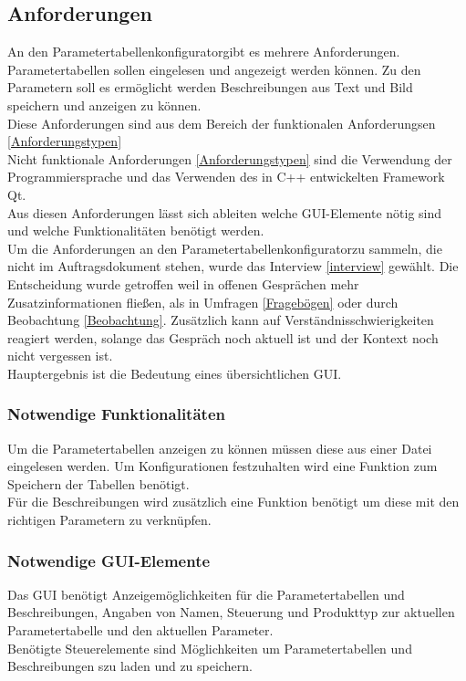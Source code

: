 \documentclass[12pt,a4paper]{article}
\begin{document}
\subsection{Anforderungen}
\label{Anfs} 
An den \glqq Parametertabellenkonfigurator\grqq\space gibt es mehrere Anforderungen. \\
Parametertabellen sollen eingelesen und angezeigt werden können. Zu den Parametern soll es ermöglicht werden Beschreibungen aus Text und Bild speichern und anzeigen zu können.\\
Diese Anforderungen sind aus dem Bereich der funktionalen Anforderungsen \ref{Anforderungstypen}\\
Nicht funktionale Anforderungen \ref{Anforderungstypen} sind die Verwendung der Programmiersprache und das Verwenden des in C++ entwickelten Framework Qt.\\
Aus diesen Anforderungen lässt sich ableiten welche GUI-Elemente nötig sind und welche Funktionalitäten benötigt werden.\\
Um die Anforderungen an den \glqq Parametertabellenkonfigurator\grqq\space zu sammeln, die nicht im Auftragsdokument stehen, wurde das Interview \ref{interview} gewählt. Die Entscheidung wurde getroffen weil in offenen Gesprächen mehr Zusatzinformationen fließen, als in Umfragen \ref{Fragebögen} oder durch Beobachtung \ref{Beobachtung}. Zusätzlich kann auf Verständnisschwierigkeiten reagiert werden, solange das Gespräch noch aktuell ist und der Kontext noch nicht vergessen ist.\\
Hauptergebnis ist die Bedeutung eines übersichtlichen GUI.
\subsubsection{Notwendige Funktionalitäten}
Um die Parametertabellen anzeigen zu können müssen diese aus einer Datei eingelesen werden. Um Konfigurationen festzuhalten wird eine Funktion zum Speichern der Tabellen benötigt. \\
Für die Beschreibungen wird zusätzlich eine Funktion benötigt um diese mit den richtigen Parametern zu verknüpfen. \\
\subsubsection{Notwendige GUI-Elemente}
Das GUI benötigt Anzeigemöglichkeiten für die Parametertabellen und Beschreibungen, Angaben von Namen, Steuerung und Produkttyp zur aktuellen Parametertabelle und den aktuellen Parameter.\\
Benötigte Steuerelemente sind Möglichkeiten um Parametertabellen und Beschreibungen szu laden und zu speichern. 
\end{document}
